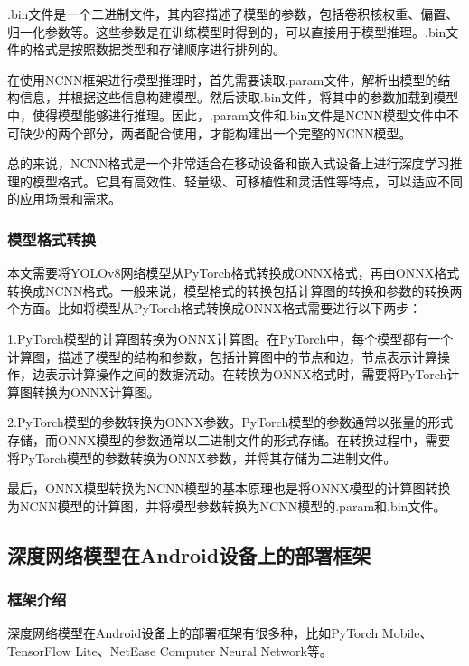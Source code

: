 \documentclass{ctexart}
\numberwithin{equation}{section}%
\numberwithin{figure}{section}%
\numberwithin{table}{section}%
\begin{document}
	.bin文件是一个二进制文件，其内容描述了模型的参数，包括卷积核权重、偏置、归一化参数等。这些参数是在训练模型时得到的，可以直接用于模型推理。.bin文件的格式是按照数据类型和存储顺序进行排列的。
	
	在使用NCNN框架进行模型推理时，首先需要读取.param文件，解析出模型的结构信息，并根据这些信息构建模型。然后读取.bin文件，将其中的参数加载到模型中，使得模型能够进行推理。因此，.param文件和.bin文件是NCNN模型文件中不可缺少的两个部分，两者配合使用，才能构建出一个完整的NCNN模型。
	
	总的来说，NCNN格式是一个非常适合在移动设备和嵌入式设备上进行深度学习推理的模型格式。它具有高效性、轻量级、可移植性和灵活性等特点，可以适应不同的应用场景和需求。
	
	\subsubsection{模型格式转换}
	本文需要将YOLOv8网络模型从PyTorch格式转换成ONNX格式，再由ONNX格式转换成NCNN格式。一般来说，模型格式的转换包括计算图的转换和参数的转换两个方面。比如将模型从PyTorch格式转换成ONNX格式需要进行以下两步：
	
	1.PyTorch模型的计算图转换为ONNX计算图。在PyTorch中，每个模型都有一个计算图，描述了模型的结构和参数，包括计算图中的节点和边，节点表示计算操作，边表示计算操作之间的数据流动。在转换为ONNX格式时，需要将PyTorch计算图转换为ONNX计算图。
	
	2.PyTorch模型的参数转换为ONNX参数。PyTorch模型的参数通常以张量的形式存储，而ONNX模型的参数通常以二进制文件的形式存储。在转换过程中，需要将PyTorch模型的参数转换为ONNX参数，并将其存储为二进制文件。
	
	最后，ONNX模型转换为NCNN模型的基本原理也是将ONNX模型的计算图转换为NCNN模型的计算图，并将模型参数转换为NCNN模型的.param和.bin文件。
	
	\subsection{深度网络模型在Android设备上的部署框架}
	\subsubsection{框架介绍}
	深度网络模型在Android设备上的部署框架有很多种，比如PyTorch Mobile、TensorFlow Lite、NetEase Computer Neural Network等。
	
\end{document}
